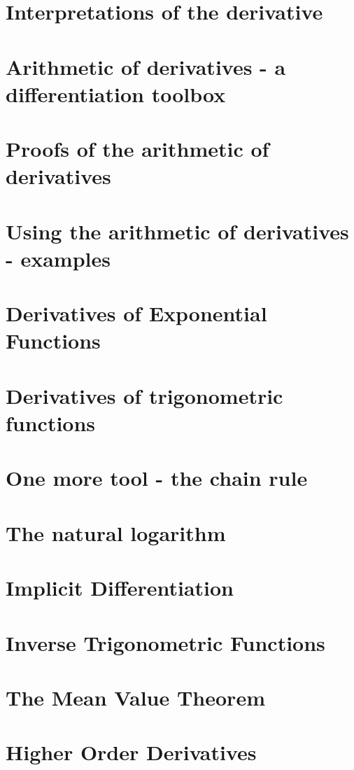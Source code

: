 \documentclass[12pt,letterpaper]{book}
\begin{document}
\section{Interpretations of the derivative}

\section{Arithmetic of derivatives - a differentiation toolbox}

%
\section{Proofs of the arithmetic of derivatives} 
%
\section{Using the arithmetic of derivatives - examples}

\section{Derivatives of Exponential Functions}

\section{Derivatives of trigonometric functions}

\section{One more tool - the chain rule}

\section{The natural logarithm}

\section{Implicit Differentiation}

\section{Inverse Trigonometric Functions}

\section{The Mean Value Theorem}

\section{Higher Order Derivatives}

\end{document}
